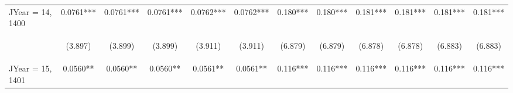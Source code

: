 \documentclass[]{article}
\begin{document}
\begin{center}
\begin{tabular}{lccccccccccc}
JYear = 14, 1400 & 0.0761*** & 0.0761*** & 0.0761*** & 0.0762*** & 0.0762*** & 0.180*** & 0.180*** & 0.181*** & 0.181*** & 0.181*** & 0.181*** \\
\vspace{4pt} & \begin{footnotesize}(3.897)\end{footnotesize} & \begin{footnotesize}(3.899)\end{footnotesize} & \begin{footnotesize}(3.899)\end{footnotesize} & \begin{footnotesize}(3.911)\end{footnotesize} & \begin{footnotesize}(3.911)\end{footnotesize} & \begin{footnotesize}(6.879)\end{footnotesize} & \begin{footnotesize}(6.879)\end{footnotesize} & \begin{footnotesize}(6.878)\end{footnotesize} & \begin{footnotesize}(6.878)\end{footnotesize} & \begin{footnotesize}(6.883)\end{footnotesize} & \begin{footnotesize}(6.883)\end{footnotesize} \\
JYear = 15, 1401 & 0.0560** & 0.0560** & 0.0560** & 0.0561** & 0.0561** & 0.116*** & 0.116*** & 0.116*** & 0.116*** & 0.116*** & 0.116*** \\

\end{tabular}
\end{center}
\end{document}
